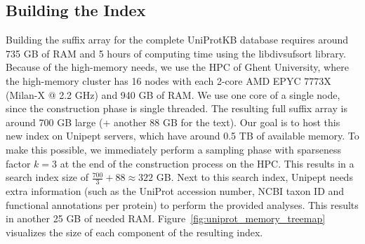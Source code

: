 \documentclass[11pt]{article}
\newenvironment{Figure}
{\par\medskip\noindent\minipage{\linewidth}}
{\endminipage\par\medskip}
\begin{document}
\begin{multicols}{2}
        \subsection{Building the Index}
        Building the suffix array for the complete UniProtKB database requires around 735 GB of RAM and 5 hours of computing time using the libdivsufsort library.
        Because of the high-memory needs, we use the HPC of Ghent University, where the high-memory cluster has 16 nodes with each 2-core AMD EPYC 7773X (Milan-X @ 2.2 GHz) and 940 GB of RAM\@.
        We use one core of a single node, since the construction phase is single threaded.
        The resulting full suffix array is around 700 GB large (+ another 88 GB for the text).
        Our goal is to host this new index on Unipept servers, which have around 0.5 TB of available memory.
        To make this possible, we immediately perform a sampling phase with sparseness factor $k = 3$ at the end of the construction process on the HPC\@.
        This results in a search index size of $\frac{700}{3} + 88 \approx 322$ GB\@.
        Next to this search index, Unipept needs extra information (such as the UniProt accession number, NCBI taxon ID and functional annotations per protein) to perform the provided analyses.
        This results in another 25 GB of needed RAM\@.
        Figure~\ref{fig:uniprot_memory_treemap} visualizes the size of each component of the resulting index.

        \begin{Figure}
            \centering
            \label{fig:uniprot_memory_treemap}
        \end{Figure}


\end{multicols}
\end{document}
